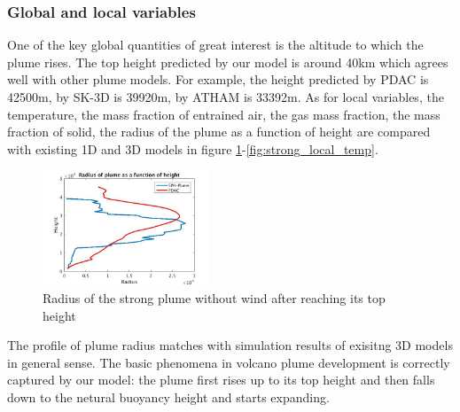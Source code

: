 \documentclass[10pt,a4paper]{article}
\begin{document}
\subsubsection{Global and local variables}
One of the key global quantities of great interest is the altitude to which the plume rises. The top height predicted by our model is around 40km which agrees well with other plume models. For example, the height predicted by PDAC is 42500m, by SK-3D is 39920m, by ATHAM is 33392m. As for local variables, the temperature, the mass fraction of entrained air, the gas mass fraction, the mass fraction of solid, the radius of the plume as a function of height are compared with existing 1D and 3D models in figure \ref{fig:strong_local_radius}-\ref{fig:strong_local_temp}. 
\\
\begin{figure}
\center
\includegraphics[width=5cm]{radius_strong}
\caption{Radius of the strong plume without wind after reaching its top height}
\label{fig:strong_local_radius}
\end{figure}
The profile of plume radius matches with simulation results of exisitng 3D models in general sense. The basic phenomena in volcano plume development is correctly captured by our model: the plume first rises up to its top height and then falls down to the netural buoyancy height and starts expanding.\\
\end{document}
